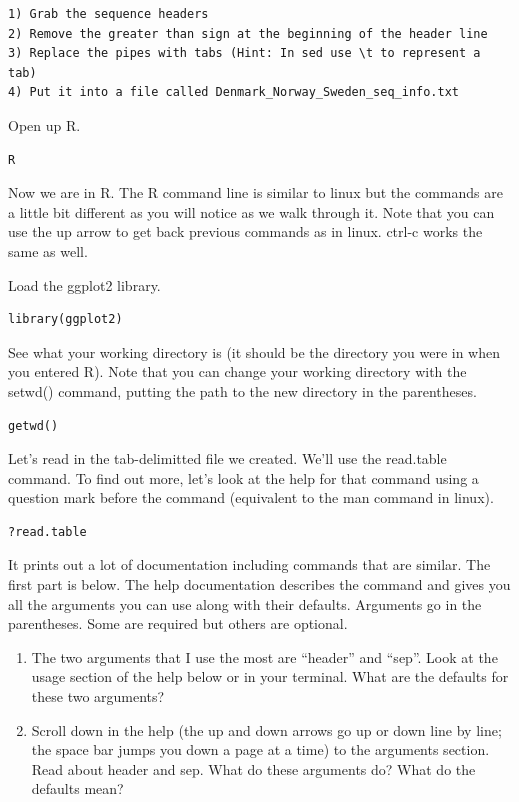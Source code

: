\documentclass[
]{book}
\begin{document}
\begin{verbatim}
1) Grab the sequence headers
2) Remove the greater than sign at the beginning of the header line
3) Replace the pipes with tabs (Hint: In sed use \t to represent a tab)
4) Put it into a file called Denmark_Norway_Sweden_seq_info.txt
\end{verbatim}

Open up R.

\begin{verbatim}
R
\end{verbatim}

Now we are in R. The R command line is similar to linux but the commands are a little bit different as you will notice as we walk through it. Note that you can use the up arrow to get back previous commands as in linux. ctrl-c works the same as well.

Load the ggplot2 library.

\begin{verbatim}
library(ggplot2)
\end{verbatim}

See what your working directory is (it should be the directory you were in when you entered R). Note that you can change your working directory with the setwd() command, putting the path to the new directory in the parentheses.

\begin{verbatim}
getwd()
\end{verbatim}

Let's read in the tab-delimitted file we created. We'll use the read.table command. To find out more, let's look at the help for that command using a question mark before the command (equivalent to the man command in linux).

\begin{verbatim}
?read.table
\end{verbatim}

It prints out a lot of documentation including commands that are similar. The first part is below. The help documentation describes the command and gives you all the arguments you can use along with their defaults. Arguments go in the parentheses. Some are required but others are optional.

\begin{enumerate}
\def\labelenumi{\arabic{enumi}.}
\setcounter{enumi}{11}
\item
  The two arguments that I use the most are ``header'' and ``sep''. Look at the usage section of the help below or in your terminal. What are the defaults for these two arguments?
\item
  Scroll down in the help (the up and down arrows go up or down line by line; the space bar jumps you down a page at a time) to the arguments section. Read about header and sep. What do these arguments do? What do the defaults mean?
\end{enumerate}
\end{document}
